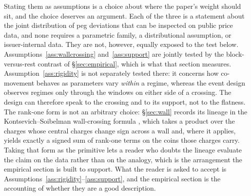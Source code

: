 Stating them as assumptions is a choice about where the paper's weight should sit, and the choice deserves an argument. Each of the three is a statement about the joint distribution of peg deviations that can be inspected on public price data, and none requires a parametric family, a distributional assumption, or issuer-internal data. They are not, however, equally exposed to the test below. Assumptions~\ref{ass:wallcrossing} and~\ref{ass:support} are jointly tested by the block-versus-rest contrast of \S\ref{sec:empirical}, which is what that section measures. Assumption~\ref{ass:rigidity} is not separately tested there: it concerns how co-movement behaves as parameters vary \emph{within} a regime, whereas the event design observes regimes only through the windows on either side of a crossing. The design can therefore speak to the crossing and to its support, not to the flatness. The rank-one form is not an arbitrary choice: \S\ref{sec:wall} records its lineage in the Kontsevich--Soibelman wall-crossing formula \citep{KontsevichSoibelman2008}, which takes a product over the charges whose central charges change sign across a wall and, where it applies, yields exactly a signed sum of rank-one terms on the coins those charges carry. Taking that form as the primitive lets a reader who doubts the lineage evaluate the claim on the data rather than on the analogy, which is the arrangement the empirical section is built to support. What the reader is asked to accept is Assumptions~\ref{ass:rigidity}--\ref{ass:support}, and the empirical section is the accounting of whether they are a good description.
